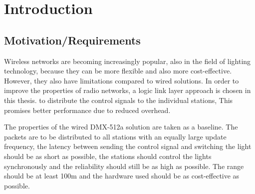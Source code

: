 \chapter{Introduction}


\section*{Motivation/Requirements}


Wireless networks are becoming increasingly popular, also in the field of lighting technology,
because they can be more flexible and also more cost-effective.
However, they also have limitations compared to wired solutions.
In order to improve the properties of radio networks, a logic link layer approach is chosen in this thesis.
to distribute the control signals to the individual stations,
This promises better performance due to reduced overhead.

The properties of the wired DMX-512a solution are taken as a baseline.
The packets are to be distributed to all stations with an equally large update frequency,
the latency between sending the control signal and switching the light should be as short as possible,
the stations should control the lights synchronously and the reliability should still be as high as possible.
The range should be at least 100m and the hardware used should be as cost-effective as possible.

